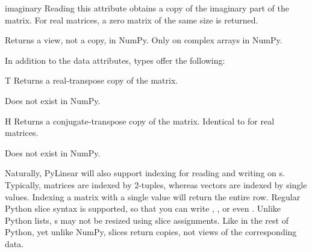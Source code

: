 \begin{memberdesc}[Array]{imaginary}
  Reading this attribute obtains a copy of the imaginary part of the matrix.
  For real matrices, a zero matrix of the same size is returned.

  Returns a view, not a copy, in NumPy. Only on complex arrays in NumPy.
\end{memberdesc}

In addition to the  data attributes,  types
offer the following:

\begin{memberdesc}[Matrix]{T}
  Returns a real-transpose copy of the matrix.

  Does not exist in NumPy.
\end{memberdesc}

\begin{memberdesc}[Matrix]{H}
  Returns a conjugate-transpose copy of the matrix.
  Identical to  for real matrices.

  Does not exist in NumPy.
\end{memberdesc}

Naturally, PyLinear will also support indexing for reading and writing
on s. Typically, matrices are indexed by 2-tuples,
whereas vectors are indexed by single values. Indexing a matrix with a
single value will return the entire row. Regular Python slice syntax
is supported, so that you can write , ,
or even . Unlike Python lists, s may not be
resized using slice assignments. Like in the rest of Python, yet
unlike NumPy, slices return copies, not views of the corresponding
data.

